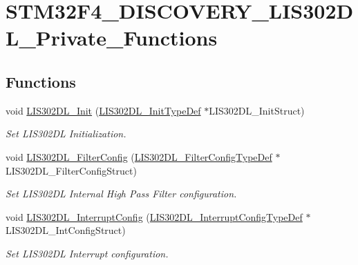 \hypertarget{group___s_t_m32_f4___d_i_s_c_o_v_e_r_y___l_i_s302_d_l___private___functions}{\section{S\-T\-M32\-F4\-\_\-\-D\-I\-S\-C\-O\-V\-E\-R\-Y\-\_\-\-L\-I\-S302\-D\-L\-\_\-\-Private\-\_\-\-Functions}
\label{group___s_t_m32_f4___d_i_s_c_o_v_e_r_y___l_i_s302_d_l___private___functions}
}
\subsection*{Functions}
\begin{DoxyCompactItemize}
\item 
void \hyperlink{group___s_t_m32_f4___d_i_s_c_o_v_e_r_y___l_i_s302_d_l___private___functions_ga0ceeaa64f528427ffca42afd45051df6}{L\-I\-S302\-D\-L\-\_\-\-Init} (\hyperlink{struct_l_i_s302_d_l___init_type_def}{L\-I\-S302\-D\-L\-\_\-\-Init\-Type\-Def} $\ast$L\-I\-S302\-D\-L\-\_\-\-Init\-Struct)
\begin{DoxyCompactList}\small\item\em Set L\-I\-S302\-D\-L Initialization. \end{DoxyCompactList}\item 
void \hyperlink{group___s_t_m32_f4___d_i_s_c_o_v_e_r_y___l_i_s302_d_l___private___functions_ga0c2ce8efd66b092a82e64f88ed5b9e9a}{L\-I\-S302\-D\-L\-\_\-\-Filter\-Config} (\hyperlink{struct_l_i_s302_d_l___filter_config_type_def}{L\-I\-S302\-D\-L\-\_\-\-Filter\-Config\-Type\-Def} $\ast$L\-I\-S302\-D\-L\-\_\-\-Filter\-Config\-Struct)
\begin{DoxyCompactList}\small\item\em Set L\-I\-S302\-D\-L Internal High Pass Filter configuration. \end{DoxyCompactList}\item 
void \hyperlink{group___s_t_m32_f4___d_i_s_c_o_v_e_r_y___l_i_s302_d_l___private___functions_ga0c6ea80d35be5abeb3bd1d06355481e8}{L\-I\-S302\-D\-L\-\_\-\-Interrupt\-Config} (\hyperlink{struct_l_i_s302_d_l___interrupt_config_type_def}{L\-I\-S302\-D\-L\-\_\-\-Interrupt\-Config\-Type\-Def} $\ast$L\-I\-S302\-D\-L\-\_\-\-Int\-Config\-Struct)
\begin{DoxyCompactList}\small\item\em Set L\-I\-S302\-D\-L Interrupt configuration. \end{DoxyCompactList}\item 

\end{DoxyCompactItemize}
